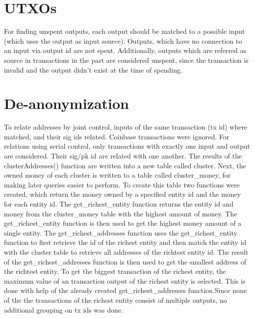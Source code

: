\documentclass[12pt,a4paper]{article}
\begin{document}
\section{UTXOs}

For finding unspent outputs, each output should be matched to a possible input (which uses the output as input source).
Outputs, which have no connection to an input via output id are not spent. Additionally, outputs which are referred as source in transactions
in the past are considered unspent, since the transaction is invalid and the output didn't exist at the time of spending.

\section{De-anonymization}

To relate addresses by joint control, inputs of the same transaction (tx id) where matched, and their sig ids related. Coinbase transactions were ignored.
\newline\newline
For relations using serial control, only transactions with exactly one input and output are considered. Their sig/pk id are related with one another.
\newline\newline
The results of the clusterAddresses() function are written into a new table called cluster.
\newline\newline
Next, the owned money of each cluster is written to a table called cluster\_money, for making later queries easier to perform.
To create this table two functions were created, which return the money owned by a specified entity id and the money for each entity id.
\newline\newline
The get\_richest\_entity function returns the entity id and money from the cluster\_money table with the highest amount of money.
\newline\newline
The get\_richest\_entity function is then used to get the highest money amount of a single entity.
\newline\newline
The get\_richest\_addresses function uses the get\_richest\_entity function to first retrieve the id of the richest entity and then match
the entity id with the cluster table to retrieve all addresses of the richtest entity id.
\newline\newline
The result of the get\_richest\_addresses function is then used to get the smallest address of the richtest entity.
\newline\newline
To get the biggest transaction of the richest entity, the maximum value of an transaction output of the richest entity is selected.
This is done with help of the already created get\_richest\_addresses function.Since
none of the the transactions of the richest entity consist of multiple outputs, no additional grouping on tx ids was done.
\end{document}
